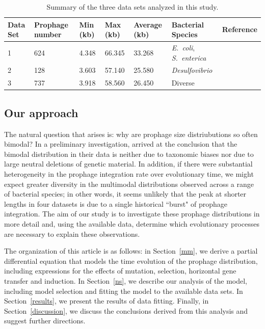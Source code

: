 \begin{table}[H]
\centering
\begin{tabular}{ p{1.2cm}p{1.5cm}p{1cm}p{1cm}p{1.5cm}p{3.5cm}p{3.5cm}}
\hline
Data Set & Prophage number & Min (kb)& Max (kb)& Average (kb)& Bacterial Species &Reference \\
\hline
1 & 624 &4.348& 66.345& 33.268 & \textit{E.~coli}, \textit{S.~enterica} &\cite{bobay_pervasive_2014}\\

2& 128 & 3.603 & 57.140 & 25.580 & \textit{Desulfovibrio} &\cite{crispim_screening_2018}\\

3& 737 & 3.918 & 58.560  & 26.450 & Diverse &\cite{leplae_aclame:_2010}\\
\hline
\end{tabular}
\caption{Summary of the three data sets analyzed in this study. }
\label{table:2}
\end{table}

\subsection{Our approach}
 The natural question that arises is: why are prophage size distriubutions so often bimodal?  In a preliminary investigation, \cite{bobay_pervasive_2014} arrived at the conclusion that the bimodal distribution in their data is neither due to taxonomic biases nor due to large neutral deletions of genetic material. 
 In addition, if there were substantial heterogeneity in the prophage integration rate over evolutionary time, we might expect greater diversity in the multimodal distributions observed across a range of bacterial species; in other words, it seems unlikely that the peak at shorter lengths in four datasets is due to a single historical ``burst" of prophage integration.
 The aim of our study is to investigate these prophage distributions in more detail and, using the available data, determine which evolutionary processes are necessary to explain these observations. 
 
 The organization of this article is as follows: in Section~\ref{mm}, we derive a partial differential equation that models the time evolution of the prophage distribution, including expressions for the effects of mutation, selection, horizontal gene transfer and induction. In Section~\ref{ns}, we describe our analysis of the model, including model selection and fitting the model to the available data sets. In Section~\ref{results}, we present the results of data fitting. Finally, in Section~\ref{discussion}, we discuss the conclusions derived from this analysis and suggest further directions.
  
